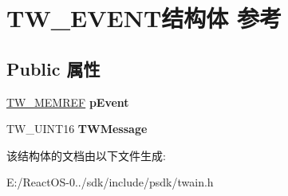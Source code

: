 \hypertarget{struct_t_w___e_v_e_n_t}{}\section{T\+W\+\_\+\+E\+V\+E\+N\+T结构体 参考}
\label{struct_t_w___e_v_e_n_t}
\subsection*{Public 属性}
\begin{DoxyCompactItemize}
\item 
\mbox{\label{struct_t_w___e_v_e_n_t_a73a6e78afb6335b23d81c47494479a8d}} 
\hyperlink{interfacevoid}{T\+W\+\_\+\+M\+E\+M\+R\+EF} {\bfseries p\+Event}
\item 
\mbox{\label{struct_t_w___e_v_e_n_t_a80ef208fe2b559486355110d369a4fb4}} 
T\+W\+\_\+\+U\+I\+N\+T16 {\bfseries T\+W\+Message}
\end{DoxyCompactItemize}


该结构体的文档由以下文件生成\+:\begin{DoxyCompactItemize}
\item 
E\+:/\+React\+O\+S-\/0../sdk/include/psdk/twain.\+h\end{DoxyCompactItemize}
